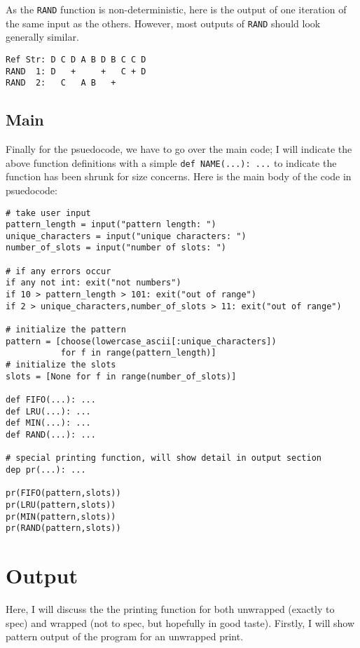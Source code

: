 \documentclass[11pt]{article}
\begin{document}
As the \texttt{RAND} function is non-deterministic, here is the output of one iteration of the same input as the others.
However, most outputs of \texttt{RAND} should look generally similar.

\begin{lstlisting}
Ref Str: D C D A B D B C C D
RAND  1: D   +     +   C + D
RAND  2:   C   A B   +
\end{lstlisting}

\subsection{Main}

Finally for the psuedocode, we have to go over the main code; I will indicate the above function definitions with a simple \texttt{def NAME(...): ...} to indicate the function has been shrunk for size concerns.
Here is the main body of the code in psuedocode:

\begin{lstlisting}
# take user input
pattern_length = input("pattern length: ")
unique_characters = input("unique characters: ")
number_of_slots = input("number of slots: ")

# if any errors occur
if any not int: exit("not numbers")
if 10 > pattern_length > 101: exit("out of range")
if 2 > unique_characters,number_of_slots > 11: exit("out of range")

# initialize the pattern
pattern = [choose(lowercase_ascii[:unique_characters])
           for f in range(pattern_length)]
# initialize the slots
slots = [None for f in range(number_of_slots)]

def FIFO(...): ...
def LRU(...): ...
def MIN(...): ...
def RAND(...): ...

# special printing function, will show detail in output section
dep pr(...): ...

pr(FIFO(pattern,slots))
pr(LRU(pattern,slots))
pr(MIN(pattern,slots))
pr(RAND(pattern,slots))

\end{lstlisting}

\section{Output}

Here, I will discuss the the printing function for both unwrapped (exactly to spec) and wrapped (not to spec, but hopefully in good taste).
Firstly, I will show pattern output of the program for an unwrapped print.
\end{document}
